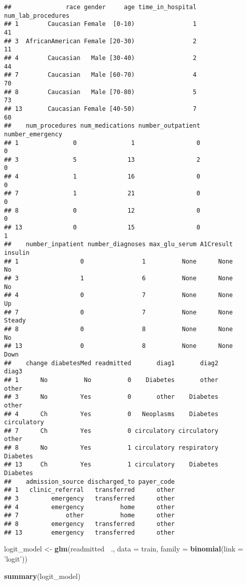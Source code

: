 \documentclass[]{article}
\newenvironment{Shaded}{\begin{snugshade}}{\end{snugshade}}
\newcommand{\KeywordTok}[1]{\textcolor[rgb]{0.13,0.29,0.53}{\textbf{#1}}}
\newcommand{\DataTypeTok}[1]{\textcolor[rgb]{0.13,0.29,0.53}{#1}}
\newcommand{\StringTok}[1]{\textcolor[rgb]{0.31,0.60,0.02}{#1}}
\newcommand{\OperatorTok}[1]{\textcolor[rgb]{0.81,0.36,0.00}{\textbf{#1}}}
\newcommand{\NormalTok}[1]{#1}
\begin{document}
\begin{verbatim}
##               race gender     age time_in_hospital num_lab_procedures
## 1        Caucasian Female  [0-10)                1                 41
## 3  AfricanAmerican Female [20-30)                2                 11
## 4        Caucasian   Male [30-40)                2                 44
## 7        Caucasian   Male [60-70)                4                 70
## 8        Caucasian   Male [70-80)                5                 73
## 13       Caucasian Female [40-50)                7                 60
##    num_procedures num_medications number_outpatient number_emergency
## 1               0               1                 0                0
## 3               5              13                 2                0
## 4               1              16                 0                0
## 7               1              21                 0                0
## 8               0              12                 0                0
## 13              0              15                 0                1
##    number_inpatient number_diagnoses max_glu_serum A1Cresult insulin
## 1                 0                1          None      None      No
## 3                 1                6          None      None      No
## 4                 0                7          None      None      Up
## 7                 0                7          None      None  Steady
## 8                 0                8          None      None      No
## 13                0                8          None      None    Down
##    change diabetesMed readmitted       diag1       diag2       diag3
## 1      No          No          0    Diabetes       other       other
## 3      No         Yes          0       other    Diabetes       other
## 4      Ch         Yes          0   Neoplasms    Diabetes circulatory
## 7      Ch         Yes          0 circulatory circulatory       other
## 8      No         Yes          1 circulatory respiratory    Diabetes
## 13     Ch         Yes          1 circulatory    Diabetes    Diabetes
##    admission_source discharged_to payer_code
## 1   clinic_referral   transferred      other
## 3         emergency   transferred      other
## 4         emergency          home      other
## 7             other          home      other
## 8         emergency   transferred      other
## 13        emergency   transferred      other
\end{verbatim}

\begin{Shaded}
\begin{Highlighting}[]
\NormalTok{logit_model <-}\StringTok{ }\KeywordTok{glm}\NormalTok{(readmitted }\OperatorTok{~}\NormalTok{., }\DataTypeTok{data =}\NormalTok{ train, }\DataTypeTok{family =} \KeywordTok{binomial}\NormalTok{(}\DataTypeTok{link =} \StringTok{'logit'}\NormalTok{))}

\KeywordTok{summary}\NormalTok{(logit_model)}
\end{Highlighting}
\end{Shaded}
\end{document}
